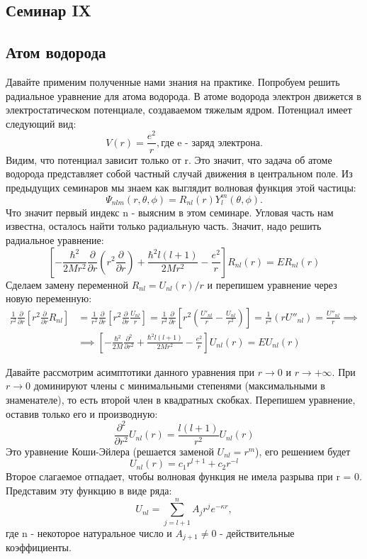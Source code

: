 \begin{center}
    \section{Семинар IX}
\end{center}
\subsection{Атом водорода}
\hspace{1em} Давайте применим полученные нами знания на практике. Попробуем решить радиальное уравнение для атома водорода. В атоме водорода электрон движется в электростатическом потенциале, создаваемом тяжелым ядром. Потенциал имеет следующий вид:
\[
V(r) = \frac{e^2}{r}, \text{где e - заряд электрона}.
\]
Видим, что потенциал зависит только от r. Это значит, что задача об атоме водорода представляет собой частный случай движения в центральном поле. Из предыдущих семинаров мы знаем как выглядит волновая функция этой частицы:
\[
\Psi_{nlm}(r, \theta, \phi) = R_{nl}(r)Y^m_l(\theta, \phi).
\]
Что значит первый индекс n - выясним в этом семинаре. Угловая часть нам известна, осталось найти только радиальную часть. Значит, надо решить радиальное уравнение:
\[
\left[ -\frac{\hbar^2}{2Mr^2}\frac{\partial}{\partial r}(r^2 \frac{\partial}{\partial r}) + \frac{\hbar^2 l(l+1)}{2Mr^2} - \frac{e^2}{r}\right]R_{nl}(r) = ER_{nl}(r)
\]
Сделаем замену переменной $R_{nl}=U_{nl}(r)/r$ и перепишем уравнение через новую переменную:
\begin{align*}
\frac{1}{r^2}\frac{\partial}{\partial r}\left[ r^2 \frac{\partial}{\partial r} R_{nl} \right] &= \frac{1}{r^2}\frac{\partial}{\partial r}\left[ r^2 \frac{\partial}{\partial r} \frac{U_{nl}}{r} \right] = \frac{1}{r^2}\frac{\partial}{\partial r}\left[ r^2 (\frac{U'_{nl}}{r} - \frac{U_{nl}}{r^2}) \right] =  \frac{1}{r^2}\left(rU''_{nl}\right) = \frac{U''_{nl}}{r} \implies \\
&\implies  \left[ -\frac{\hbar^2}{2M}\frac{\partial^2}{\partial r^2} + \frac{\hbar^2 l(l+1)}{2Mr^2} - \frac{e^2}{r}\right]U_{nl}(r) = EU_{nl}(r)
\end{align*}

Давайте рассмотрим асимптотики данного уравнения при $r \rightarrow 0$ и $r \rightarrow +\infty$. При $r \rightarrow 0$ доминируют члены с минимальными степенями (максимальными в знаменателе), то есть второй член в квадратных скобках. Перепишем уравнение, оставив только его и производную:
\[
\frac{\partial^2}{\partial r^2} U_{nl}(r) = \frac{l(l+1)}{r^2} U_{nl}(r)
\]
Это уравнение Коши-Эйлера (решается заменой $U_{nl} = r^m$), его решением будет
\[
U_{nl}(r) = c_1r^{l+1} + c_2 r^{-l}
\]
Второе слагаемое отпадает, чтобы волновая функция не имела разрыва при r = 0. Представим эту функцию в виде ряда:
\[
U_{nl} = \sum\limits_{j=l+1}^{n}A_j r^j e^{-\kappa r},
\]
где n - некоторое натуральное число и $A_{j+1} \neq 0$ - действительные коэффициенты. 

